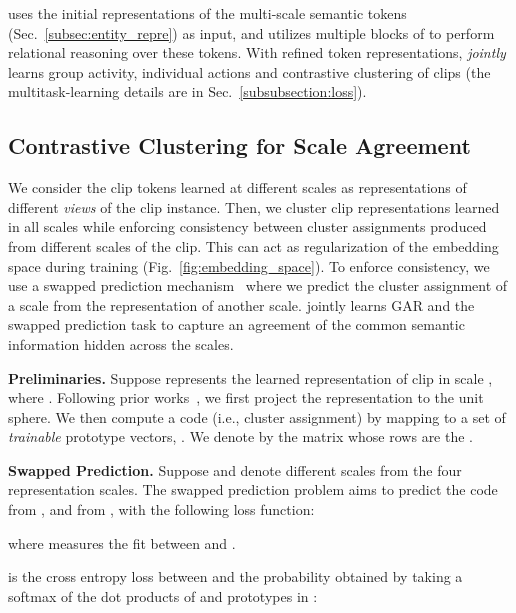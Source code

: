 \documentclass[runningheads]{llncs}
\begin{document}
\ours uses
the initial representations of the multi-scale semantic tokens (Sec.~\ref{subsec:entity_repre}) as input, and utilizes multiple blocks of \mtx to perform relational reasoning over these tokens.
With refined token representations, \ours \textit{jointly} learns group activity, individual actions and contrastive clustering of clips (the multitask-learning details are in Sec.~\ref{subsubsection:loss}). 






\subsection{Contrastive Clustering for Scale Agreement}
\label{subsec:contrastive}






We consider the
clip tokens learned at different scales as representations of different \textit{views} of the clip
instance. 
Then, we cluster clip representations learned in all scales while enforcing consistency between cluster assignments produced from different scales of the clip.
This can act as regularization of the embedding space during training (Fig.~\ref{fig:embedding_space}).
To enforce consistency, we use a swapped prediction mechanism~\cite{swav} where we predict the cluster assignment 
of a scale from the representation of another scale. \ours jointly
learns GAR and the swapped prediction task 
to capture an agreement of the common semantic information hidden across the scales.




\noindent \textbf{Preliminaries.} 
Suppose  represents the learned representation of clip 
in scale ,
where . Following prior works~\cite{swav,khosla2020supervised}, we first project the representation to the unit sphere.
We then compute a code (i.e., cluster assignment)  
by mapping  to a set of  \textit{trainable} prototype vectors, . We denote by  the matrix whose rows are the .

\noindent \textbf{Swapped Prediction.} Suppose  and  denote  different scales from the four representation scales.
The swapped prediction problem aims to predict the code  from 
, and  from , with the following loss function:

where  measures the fit between 
 and 
.
 
is the cross entropy loss between 
 and the probability obtained by taking a softmax of the dot products of  and 
prototypes in :
\end{document}
